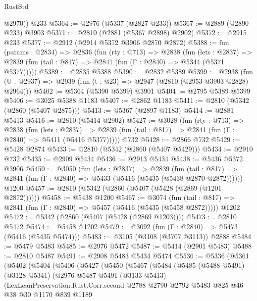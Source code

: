 \begin{lexlean}{RustStd}
\begin{coremodule}
        @2970))
    @233
@5364 := @2976 (@5337 (@2827 @233))
@5367 := @2889 (@2890 @233) @3903
@5371 := @2810 (@2881 (@5367 @2898) @2902)
@5372 := @2915 @233
@5377 := @2912 (@2914 @5372 @3906 @2870 @2872)
@5388 := fun (params : @2834) =>
  @2836
    (fun (rty : @713) =>
    @2838
      (fun (lets : @2837) =>
      @2839 (fun (tail : @817) => @2841 (fun (Γ : @2840) => @5344 (@5371 @5377)))))
@5389 := @2835 @5388
@5390 := @2832 @5389
@5399 := @2938 (fun (U : @2937) => @2939 (fun (t : @23) => @2947 (@2810 (@2953 @3903 @2828) @2964)))
@5402 := @5364 (@5390 @5399) @3901
@5404 := @2795 @5389 @5399
@5406 := @3025 @5388 @1183
@5407 := @2862 @1183
@5411 := @2810 (@5342 (@2860 (@5407 @2875)))
@5413 := @5367 (@2897 @1183)
@5414 := @2881 @5413
@5416 := @2810 (@5414 @2902)
@5427 := @3028
    (fun (rty : @713) =>
    @2838
      (fun (lets : @2837) =>
      @2839 (fun (tail : @817) => @2841 (fun (Γ : @2840) => @5411 (@5416 @5377)))))
    @732
@5428 := @2866 @732
@5429 := @5428 @2874
@5433 := @2810 (@5342 (@2860 (@5407 @5429)))
@5434 := @2910 @732
@5435 := @2909 @5434
@5436 := @2913 @5434
@5438 := @5436 @5372 @3906
@5450 := @3050
    (fun (lets : @2837) =>
    @2839
      (fun (tail : @817) => @2841 (fun (Γ : @2840) => @5433 (@5416 (@5435 (@5438 @2870 @2872))))))
    @1200
@5457 := @2810 (@5342 (@2860 (@5407 (@5428 (@2869 (@1201 @2872))))))
@5458 := @5438 @1200
@5467 := @3074
    (fun (tail : @817) => @2841 (fun (Γ : @2840) => @5457 (@5416 (@5435 (@5458 @2872)))))
    @1202
@5472 := @5342 (@2860 (@5407 (@5428 (@2869 @1203))))
@5473 := @2810 @5472
@5474 := @5458 @1202
@5479 := @3092 (fun (Γ : @2840) => @5473 (@5416 (@5435 @5474)))
@5483 := @3105 (@3108 (@3707 @3113)) @2888
@5484 := @5479 @5483
@5485 := @2976 @5472
@5487 := @5414 (@2901 @5483)
@5488 := @2810 @5487
@5491 := @2908 @5483 @5434 @5474
@5536 := @5336
    (@5361
      (@5402
        (@5404
          (@5406
            (@5427
              (@5450
                (@5467
                  (@5484
                    (@5485
                      (@5488 @5491)
                      (@3128 @5341)
                      (@2976
                        @5487
                        @5491
                        (@3133 @5413)
                        (LexLeanPreservation.Rust.Corr.second
                          @2788
                          @2790
                          @2792
                          @5483
                          @825
                          @46
                          @38
                          @30
                          @1170
                          @839
                          @1189

\end{coremodule}
\end{lexlean}
